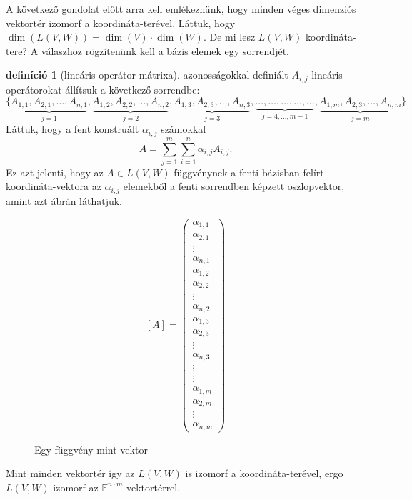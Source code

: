 \documentclass[a4paper, showtrims]{memoir}
\theoremstyle{plain}
\theoremstyle{remark}
\theoremstyle{definition}
\newtheorem{definition}[proposition]{definíció}
\begin{document}
A következő gondolat előtt arra kell emlékeznünk,
hogy minden véges dimenziós vektortér izomorf a koordináta-terével.
Láttuk, hogy $\dim \left( L\left( V,W \right) \right)=\dim(V)\cdot\dim(W)$.
De mi lesz $L\left( V,W \right)$ koordináta-tere?
A válaszhoz rögzítenünk kell a bázis elemek egy sorrendjét.
\begin{definition}[lineáris operátor mátrixa]
     azonosságokkal definiált $A_{i,j}$ lineáris operátorokat állítsuk a következő sorrendbe:
	\[
		\{
		\underbrace{A_{1,1},A_{2,1},\ldots,A_{n,1}}_{j=1},
		\underbrace{A_{1,2},A_{2,2},\ldots,A_{n,2}}_{j=2},
		\underbrace{A_{1,3},A_{2,3},\ldots,A_{n,3}}_{j=3},
		\underbrace{\dots,\ldots,\dots,\ldots,\dots}_{j=4,\ldots,m-1},
		\underbrace{A_{1,m},A_{2,3},\ldots,A_{n,m}}_{j=m}
		\}
	\]
	Láttuk, hogy a fent konstruált $\alpha_{i,j}$ számokkal
	\[
		A=
		\sum_{j=1}^m\sum_{i=1}^n\alpha_{i,j}A_{i,j}.
	\]
	Ez azt jelenti, hogy az $A\in L\left( V,W \right)$ függvénynek a fenti bázisban felírt koordináta-vektora
	az $\alpha_{i,j}$ elemekből a fenti sorrendben képzett oszlopvektor, 
    amint azt  ábrán láthatjuk.
    \begin{figure}
        \label{fig:elomatrix}
	\[
		\left[ A \right]=
		\begin{pmatrix}
			\alpha_{1,1} \\ \alpha_{2,1}\\ \vdots \\ \alpha_{n,1}\\
			\alpha_{1,2} \\ \alpha_{2,2}\\ \vdots \\ \alpha_{n,2}\\
			\alpha_{1,3} \\ \alpha_{2,3}\\ \vdots \\ \alpha_{n,3}\\
			\vdots       \\ \vdots\\
			\alpha_{1,m} \\ \alpha_{2,m}\\ \vdots \\ \alpha_{n,m}
		\end{pmatrix}\tag{\dag}
	\]
    \caption{Egy függvény mint vektor}
    \end{figure}
	Mint minden vektortér így az $L\left( V,W \right)$ is izomorf a koordináta-terével, ergo $L\left( V,W \right)$ izomorf
	az $\mathbb{F}^{n\cdot m}$ vektortérrel.


\end{definition}
\end{document}
